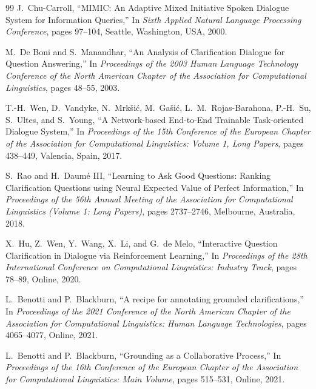\documentclass[11pt]{article}
\begin{document}
\begin{thebibliography}{99}
J.~Chu-Carroll,
\newblock ``MIMIC: An Adaptive Mixed Initiative Spoken Dialogue System for Information Queries,''
\newblock In \emph{Sixth Applied Natural Language Processing Conference}, pages 97--104, Seattle, Washington, USA, 2000.

M.~De Boni and S.~Manandhar,
\newblock ``An Analysis of Clarification Dialogue for Question Answering,''
\newblock In \emph{Proceedings of the 2003 Human Language Technology Conference of the North American Chapter of the Association for Computational Linguistics}, pages 48--55, 2003.

T.-H.~Wen, D.~Vandyke, N.~Mrk{\v{s}}i{\'c}, M.~Ga{\v{s}}i{\'c}, L.~M.~Rojas-Barahona, P.-H.~Su, S.~Ultes, and S.~Young,
\newblock ``A Network-based End-to-End Trainable Task-oriented Dialogue System,''
\newblock In \emph{Proceedings of the 15th Conference of the European Chapter of the Association for Computational Linguistics: Volume 1, Long Papers}, pages 438--449, Valencia, Spain, 2017.

S.~Rao and H.~Daum{\'e} III,
\newblock ``Learning to Ask Good Questions: Ranking Clarification Questions using Neural Expected Value of Perfect Information,''
\newblock In \emph{Proceedings of the 56th Annual Meeting of the Association for Computational Linguistics (Volume 1: Long Papers)}, pages 2737--2746, Melbourne, Australia, 2018.

X.~Hu, Z.~Wen, Y.~Wang, X.~Li, and G.~de Melo,
\newblock ``Interactive Question Clarification in Dialogue via Reinforcement Learning,''
\newblock In \emph{Proceedings of the 28th International Conference on Computational Linguistics: Industry Track}, pages 78--89, Online, 2020.

L.~Benotti and P.~Blackburn,
\newblock ``A recipe for annotating grounded clarifications,''
\newblock In \emph{Proceedings of the 2021 Conference of the North American Chapter of the Association for Computational Linguistics: Human Language Technologies}, pages 4065--4077, Online, 2021.

L.~Benotti and P.~Blackburn,
\newblock ``Grounding as a Collaborative Process,''
\newblock In \emph{Proceedings of the 16th Conference of the European Chapter of the Association for Computational Linguistics: Main Volume}, pages 515--531, Online, 2021.

\end{thebibliography}
\end{document}
